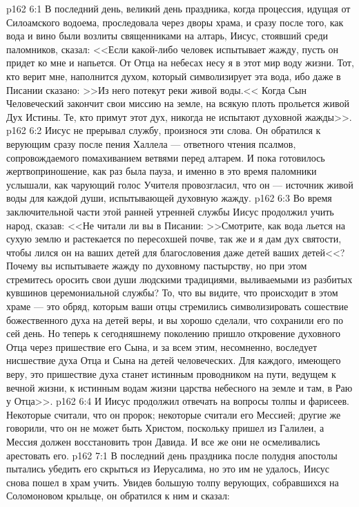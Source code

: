 \vs p162 6:1 В последний день, великий день праздника, когда процессия, идущая от Силоамского водоема, проследовала через дворы храма, и сразу после того, как вода и вино были возлиты священниками на алтарь, Иисус, стоявший среди паломников, сказал: <<Если какой\hyp{}либо человек испытывает жажду, пусть он придет ко мне и напьется. От Отца на небесах несу я в этот мир воду жизни. Тот, кто верит мне, наполнится духом, который символизирует эта вода, ибо даже в Писании сказано: >>Из него потекут реки живой воды.<< Когда Сын Человеческий закончит свои миссию на земле, на всякую плоть прольется живой Дух Истины. Те, кто примут этот дух, никогда не испытают духовной жажды>>.
\vs p162 6:2 Иисус не прерывал службу, произнося эти слова. Он обратился к верующим сразу после пения Халлела --- ответного чтения псалмов, сопровождаемого помахиванием ветвями перед алтарем. И пока готовилось жертвоприношение, как раз была пауза, и именно в это время паломники услышали, как чарующий голос Учителя провозгласил, что он --- источник живой воды для каждой души, испытывающей духовную жажду.
\vs p162 6:3 Во время заключительной части этой ранней утренней службы Иисус продолжил учить народ, сказав: <<Не читали ли вы в Писании: >>Смотрите, как вода льется на сухую землю и растекается по пересохшей почве, так же и я дам дух святости, чтобы лился он на ваших детей для благословения даже детей ваших детей<<? Почему вы испытываете жажду по духовному пастырству, но при этом стремитесь оросить свои души людскими традициями, выливаемыми из разбитых кувшинов церемониальной службы? То, что вы видите, что происходит в этом храме --- это обряд, которым ваши отцы стремились символизировать сошествие божественного духа на детей веры, и вы хорошо сделали, что сохранили его по сей день. Но теперь к сегодняшнему поколению пришло откровение духовного Отца через пришествие его Сына, и за всем этим, несомненно, воследует нисшествие духа Отца и Сына на детей человеческих. Для каждого, имеющего веру, это пришествие духа станет истинным проводником на пути, ведущем к вечной жизни, к истинным водам жизни царства небесного на земле и там, в Раю у Отца>>.
\vs p162 6:4 И Иисус продолжил отвечать на вопросы толпы и фарисеев. Некоторые считали, что он пророк; некоторые считали его Мессией; другие же говорили, что он не может быть Христом, поскольку пришел из Галилеи, а Мессия должен восстановить трон Давида. И все же они не осмеливались арестовать его.
\vs p162 7:1 В последний день праздника после полудня апостолы пытались убедить его скрыться из Иерусалима, но это им не удалось, Иисус снова пошел в храм учить. Увидев большую толпу верующих, собравшихся на Соломоновом крыльце, он обратился к ним и сказал:
